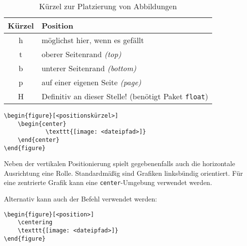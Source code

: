 \begin{table}[h!]
	\center
	\begin{tabular}{cl}
		\toprule
		Kürzel & Position                              \\
		\midrule
		h      & möglichst hier, wenn es gefällt           \\
		t      & oberer Seitenrand \emph{(top)}        \\
		b      & unterer Seitenrand \emph{(bottom)}    \\
		p      & auf einer eigenen Seite \emph{(page)} \\
		H      & Definitiv an dieser Stelle! (benötigt Paket \texttt{float}) \\
		\bottomrule
	\end{tabular}
	\caption{Kürzel zur Platzierung von Abbildungen}
	\label{tbl:positionskuerzel}
\end{table}

\begin{verbatim}
\begin{figure}[<positionskürzel>]
	\begin{center}
			\texttt{[image: <dateipfad>]}
	\end{center}
\end{figure}
\end{verbatim}

Neben der vertikalen Positionierung spielt gegebenenfalls auch die horizontale Ausrichtung eine Rolle. Standardmäßig sind Grafiken linksbündig orientiert. Für eine zentrierte Grafik kann eine \texttt{center}-Umgebung verwendet werden.

\noindent Alternativ kann auch der Befehl \texttt{\centering} verwendet werden:

\begin{verbatim}
\begin{figure}[<position>]
	\centering
	\texttt{[image: <dateipfad>]}
\end{figure}
\end{verbatim}


